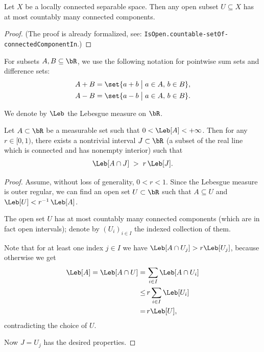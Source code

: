 \begin{lemma}
  \label{lem:countably-many-connected-components-of-open}
  \leanok
  Let $X$ be a locally connected separable space. Then any open subset $U \subseteq X$ has at
  most countably many connected components.
\end{lemma}
\begin{proof}
  \leanok
  (The proof is already formalized, see:
  \texttt{IsOpen.countable-setOf-connectedComponentIn}.)
\end{proof}

For subsets $A, B \subseteq \bR$, we use the following notation for pointwise
sum sets and difference sets:
\begin{align*}
  A + B & = \set{ a + b \; \big| \; a \in A, \, b \in B } , \\
  A - B & = \set{ a - b \; \big| \; a \in A, \, b \in B } .
\end{align*}

We denote by $\Leb$ the Lebesgue measure on $\bR$.

\begin{lemma}
  \label{lem:exists-high-overlap-interval}
  \leanok
  Let $A \subset \bR$ be a measurable set such that $0 < \Leb[A] < +\infty$.
  Then for any $r \in [0,1)$, there exists a nontrivial interval $J \subset \bR$
  (a subset of the real line which is connected and has nonempty interior)
  such that
  \begin{align*}
    \Leb[A \cap J] \; > \; r \, \Leb[J] .
  \end{align*}
\end{lemma}
\begin{proof}
  Assume, without loss of generality, $0 < r < 1$.
  Since the Lebesgue measure is outer regular, we can find an open set $U \subset \bR$
  such that $A \subseteq U$ and $\Leb[U] < r^{-1} \, \Leb[A]$.

  The open set $U$ has at most countably many connected components
  (which are in fact open intervals); denote
  by $(U_i)_{i \in I}$ the indexed collection of them.

  Note that for at least one index $j \in I$ we
  have $\Leb[A \cap U_j] > r \Leb[U_j]$,
  because otherwise we get
  \begin{align*}
    \Leb[A] = \Leb[A \cap U]
    = \, & \sum_{i \in I} \Leb[A \cap U_i] \\
    \le \, & r \sum_{i \in I} \Leb[U_i] \\
    = \, & r \Leb[U],
  \end{align*}
  contradicting the choice of $U$.

  Now $J = U_j$ has the desired properties.
\end{proof}

